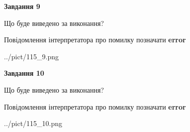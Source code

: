 \documentclass[12pt, ukrainian]{article}
\begin{document}
{{\begin {center}\textbf{Завдання 9}\end {center}}\par
Що буде виведено за виконання? \par
Повідомлення інтерпретатора про помилку позначати \textbf{error}

\begin{center}
	{../pict/115_9.png}
\end{center}
\newpage

{\begin {center}\textbf{Завдання 10}\end {center}}\par
Що буде виведено за виконання? \par
Повідомлення інтерпретатора про помилку позначати \textbf{error}

\begin{center}
	{../pict/115_10.png}
\end{center}
\newpage

}
\end{document}

